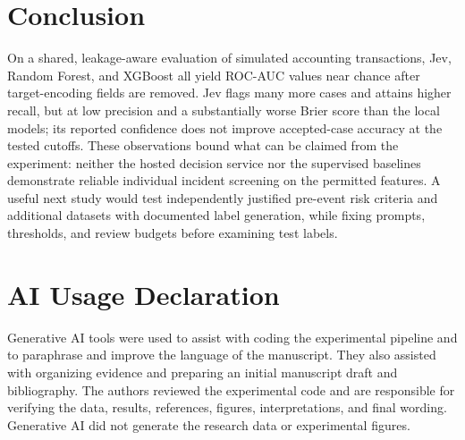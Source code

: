 \documentclass{llncs}
\begin{document}
\section{Conclusion}

On a shared, leakage-aware evaluation of simulated accounting transactions, Jev, Random Forest, and XGBoost all yield ROC-AUC values near chance after target-encoding fields are removed. Jev flags many more cases and attains higher recall, but at low precision and a substantially worse Brier score than the local models; its reported confidence does not improve accepted-case accuracy at the tested cutoffs. These observations bound what can be claimed from the experiment: neither the hosted decision service nor the supervised baselines demonstrate reliable individual incident screening on the permitted features. A useful next study would test independently justified pre-event risk criteria and additional datasets with documented label generation, while fixing prompts, thresholds, and review budgets before examining test labels.

\section*{AI Usage Declaration}
Generative AI tools were used to assist with coding the experimental pipeline and to paraphrase and improve the language of the manuscript. They also assisted with organizing evidence and preparing an initial manuscript draft and bibliography. The authors reviewed the experimental code and are responsible for verifying the data, results, references, figures, interpretations, and final wording. Generative AI did not generate the research data or experimental figures.



\end{document}

